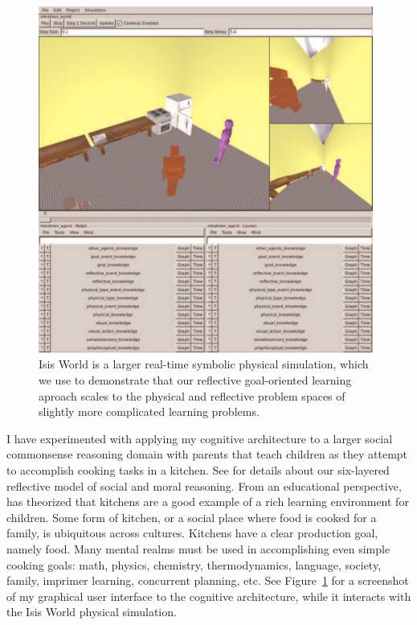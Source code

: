 \begin{figure}[bth]
  \center
  \includegraphics[width=11cm]{gfx/mindmon-isis_world-screenshot-1}
  \caption[Isis World is a larger physical simulation than the Blocks
    World toy problem.]{Isis World is a larger real-time symbolic
    physical simulation, which we use to demonstrate that our
    reflective goal-oriented learning aproach scales to the physical
    and reflective problem spaces of slightly more complicated
    learning problems.}
  \label{fig:mindmon-isis_world-screenshot-1}
\end{figure}

I have experimented with applying my cognitive architecture to a
larger social commonsense reasoning domain with parents that teach
children as they attempt to accomplish cooking tasks in a kitchen.
See \cite{morgan:2011} for details about our six-layered reflective
model of social and moral reasoning.  From an educational perspective,
\cite{dewey:1907} has theorized that kitchens are a good example of a
rich learning environment for children.  Some form of kitchen, or a
social place where food is cooked for a family, is ubiquitous across
cultures.  Kitchens have a clear production goal, namely food.  Many
mental realms must be used in accomplishing even simple cooking goals:
math, physics, chemistry, thermodynamics, language, society, family,
imprimer learning, concurrent planning, etc.  See
Figure~\ref{fig:mindmon-isis_world-screenshot-1} for a screenshot of
my graphical user interface to the cognitive architecture, while it
interacts with the Isis World physical simulation.

